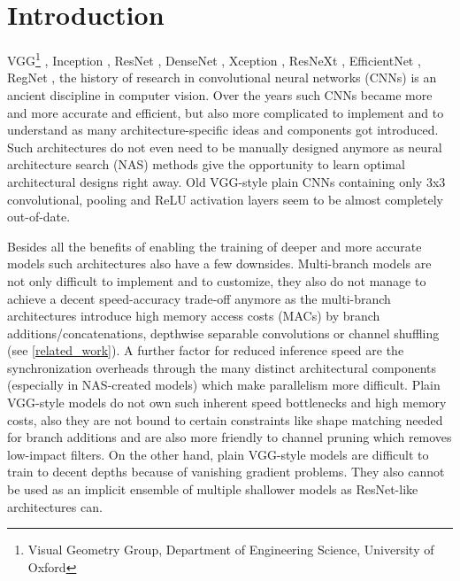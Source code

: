 \section{Introduction} \label{introduction}

VGG\footnote{Visual Geometry Group, Department of Engineering Science, University of Oxford} \cite{KarenSimonyan.2014}, Inception \cite{ChristianSzegedy.2014}, ResNet \cite{KaimingHe.2015}, DenseNet \cite{GaoHuang.2016}, Xception \cite{FrancoisChollet.2017}, ResNeXt \cite{SainingXie.2017}, EfficientNet \cite{LeMingxingTan.2019}, RegNet \cite{IlijaRadosavovic.2020}, the history of research in convolutional neural networks (CNNs) is an ancient discipline in computer vision. Over the years such CNNs became more and more accurate and efficient, but also more complicated to implement and to understand as many architecture-specific ideas and components got introduced. Such architectures do not even need to be manually designed anymore as neural architecture search (NAS) methods give the opportunity to learn optimal architectural designs right away. Old VGG-style plain CNNs containing only 3x3 convolutional, pooling and ReLU activation layers seem to be almost completely out-of-date. 

Besides all the benefits of enabling the training of deeper and more accurate models such architectures also have a few downsides. Multi-branch models are not only difficult to implement and to customize, they also do not manage to achieve a decent speed-accuracy trade-off anymore as the multi-branch architectures introduce high memory access costs (MACs) by branch additions/concatenations, depthwise separable convolutions or channel shuffling (see \autoref{related_work}). A further factor for reduced inference speed are the synchronization overheads through the many distinct architectural components (especially in NAS-created models) which make parallelism more difficult. Plain VGG-style models do not own such inherent speed bottlenecks and high memory costs, also they are not bound to certain constraints like shape matching needed for branch additions and are also more friendly to channel pruning \cite{HaoLi.2017} which removes low-impact filters. On the other hand, plain VGG-style models are difficult to train to decent depths because of vanishing gradient problems. They also cannot be used as an implicit ensemble of multiple shallower models as ResNet-like architectures can. 

